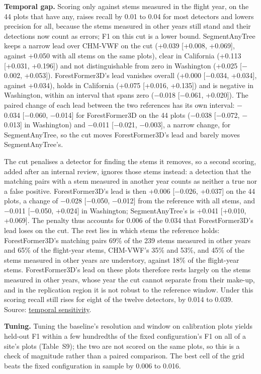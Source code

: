 \documentclass[10pt,a4paper]{article}
\begin{document}
\textbf{Temporal gap.} Scoring only against stems measured in the flight year, on the
44 plots that have any, raises recall by 0.01 to 0.04 for most detectors and
lowers precision for all, because the stems measured in other years still stand
and their detections now count as errors; F1 on this cut is a lower bound.
SegmentAnyTree keeps a narrow lead over CHM-VWF on the cut (+0.039 [+0.008,
+0.069], against +0.050 with all stems on the same plots), clear in California
(+0.113 [+0.031, +0.196]) and not distinguishable from zero in Washington
(+0.025 [$-$0.002, +0.053]). ForestFormer3D's lead vanishes overall (+0.000
[$-$0.034, +0.034], against +0.034), holds in California (+0.075 [+0.016, +0.135])
and is negative in Washington, within an interval that spans zero ($-$0.018
[$-$0.061, +0.020]). The paired change of each lead between the two references has
its own interval: $-$0.034 [$-$0.060, $-$0.014] for ForestFormer3D on the 44 plots
($-$0.038 [$-$0.072, $-$0.013] in Washington) and $-$0.011 [$-$0.021, $-$0.003], a narrow
change, for SegmentAnyTree, so the cut moves ForestFormer3D's lead and barely
moves SegmentAnyTree's.

The cut penalises a detector for finding the stems it removes, so a second
scoring, added after an internal review, ignores those stems instead: a
detection that the matching pairs with a stem measured in another year counts as
neither a true nor a false positive. ForestFormer3D's lead is then +0.006
[$-$0.026, +0.037] on the 44 plots, a change of $-$0.028 [$-$0.050, $-$0.012] from the
reference with all stems, and $-$0.011 [$-$0.050, +0.024] in Washington;
SegmentAnyTree's is +0.041 [+0.010, +0.069]. The penalty thus accounts for 0.006
of the 0.034 that ForestFormer3D's lead loses on the cut. The rest lies in which
stems the reference holds: ForestFormer3D's matching pairs 69\% of the 239 stems
measured in other years and 65\% of the flight-year stems, CHM-VWF's 35\% and 53\%,
and 45\% of the stems measured in other years are understory, against 18\% of the
flight-year stems. ForestFormer3D's lead on these plots therefore rests largely
on the stems measured in other years, whose year the cut cannot separate from
their make-up, and in the replication region it is not robust to the reference
window. Under this scoring recall still rises for eight of the twelve detectors,
by 0.014 to 0.039. Source: \href{https://github.com/devakellc/lidar-tree-benchmark/blob/main/results/temporal-sensitivity-results.md}{temporal
sensitivity}.

\textbf{Tuning.} Tuning the baseline's resolution and window on calibration plots
yields held-out F1 within a few hundredths of the fixed configuration's F1 on
all of a site's plots (Table~S9); the two are not scored on the same plots, so
this is a check of magnitude rather than a paired comparison. The best cell of
the grid beats the fixed configuration in sample by 0.006 to 0.016.
\end{document}
